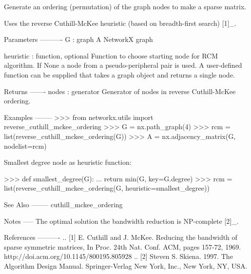 \begin{DoxyVerb}Generate an ordering (permutation) of the graph nodes to make
a sparse matrix.

Uses the reverse Cuthill-McKee heuristic (based on breadth-first search)
[1]_.

Parameters
----------
G : graph
  A NetworkX graph

heuristic : function, optional
  Function to choose starting node for RCM algorithm.  If None
  a node from a pseudo-peripheral pair is used.  A user-defined function
  can be supplied that takes a graph object and returns a single node.

Returns
-------
nodes : generator
   Generator of nodes in reverse Cuthill-McKee ordering.

Examples
--------
>>> from networkx.utils import reverse_cuthill_mckee_ordering
>>> G = nx.path_graph(4)
>>> rcm = list(reverse_cuthill_mckee_ordering(G))
>>> A = nx.adjacency_matrix(G, nodelist=rcm)

Smallest degree node as heuristic function:

>>> def smallest_degree(G):
...     return min(G, key=G.degree)
>>> rcm = list(reverse_cuthill_mckee_ordering(G, heuristic=smallest_degree))


See Also
--------
cuthill_mckee_ordering

Notes
-----
The optimal solution the bandwidth reduction is NP-complete [2]_.

References
----------
.. [1] E. Cuthill and J. McKee.
   Reducing the bandwidth of sparse symmetric matrices,
   In Proc. 24th Nat. Conf. ACM, pages 157-72, 1969.
   http://doi.acm.org/10.1145/800195.805928
.. [2]  Steven S. Skiena. 1997. The Algorithm Design Manual.
   Springer-Verlag New York, Inc., New York, NY, USA.
\end{DoxyVerb}
 
